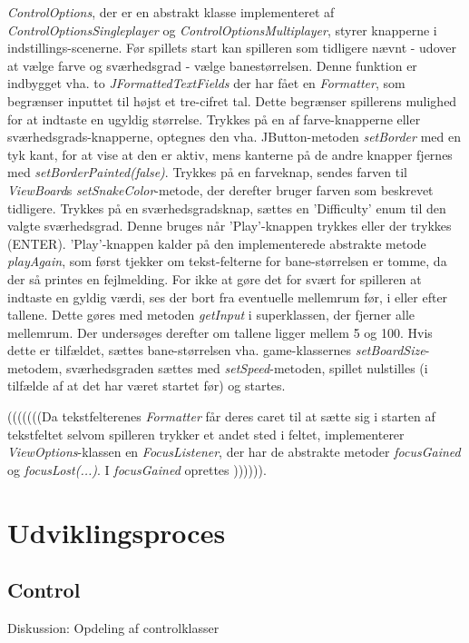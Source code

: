 \documentclass{report}
\begin{document}
\textit{ControlOptions}, der er en abstrakt klasse implementeret af \textit{ControlOptionsSingleplayer} og \textit{ControlOptionsMultiplayer}, styrer knapperne i indstillings-scenerne. Før spillets start kan spilleren som tidligere nævnt - udover at vælge farve og sværhedsgrad - vælge banestørrelsen. Denne funktion er indbygget vha. to \textit{JFormattedTextFields} der har fået en \textit{Formatter}, som begrænser inputtet til højst et tre-cifret tal. Dette begrænser spillerens mulighed for at indtaste en ugyldig størrelse. Trykkes på en af farve-knapperne eller sværhedsgrads-knapperne, optegnes den vha. JButton-metoden \textit{setBorder} med en tyk kant, for at vise at den er aktiv, mens kanterne på de andre knapper fjernes med \textit{setBorderPainted(false)}. Trykkes på en farveknap, sendes farven til \textit{ViewBoard}s \textit{setSnakeColor}-metode, der derefter bruger farven som beskrevet tidligere. Trykkes på en sværhedsgradsknap, sættes  en 'Difficulty' enum til den valgte sværhedsgrad. Denne bruges når 'Play'-knappen trykkes eller der trykkes (ENTER). 'Play'-knappen kalder på den implementerede abstrakte metode \textit{playAgain}, som først tjekker om tekst-felterne for bane-størrelsen er tomme, da der så printes en fejlmelding. For ikke at gøre det for svært for spilleren at indtaste en gyldig værdi, ses der bort fra eventuelle mellemrum før, i eller efter tallene. Dette gøres med metoden \textit{getInput} i superklassen, der fjerner alle mellemrum. Der undersøges derefter om tallene ligger mellem 5 og 100. Hvis dette er tilfældet, sættes bane-størrelsen vha. game-klassernes \textit{setBoardSize}-metodem, sværhedsgraden sættes med \textit{setSpeed}-metoden, spillet nulstilles (i tilfælde af at det har været startet før) og startes.

(((((((Da tekstfelterenes \textit{Formatter} får deres caret til at sætte sig i starten af tekstfeltet selvom spilleren trykker et andet sted i feltet, implementerer \textit{ViewOptions}-klassen en \textit{FocusListener}, der har de abstrakte metoder \textit{focusGained} og \textit{focusLost(...)}. I \textit{focusGained} oprettes )))))).

\section{Udviklingsproces}
\subsection{Control}
Diskussion: Opdeling af controlklasser
\end{document}
